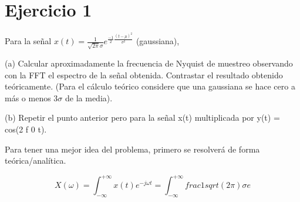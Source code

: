 \documentclass{article}
\begin{document}
\section{Ejercicio 1}

Para la señal $x(t) = \frac{1}{\sqrt{2 \pi} \sigma} e^{\frac{-1}{2} \frac{(t-\mu)^2}{\sigma^2}}$ (gaussiana),

(a) Calcular aproximadamente la frecuencia de Nyquist de muestreo observando con la FFT el
espectro de la señal obtenida. Contrastar el resultado obtenido teóricamente. (Para el cálculo
teórico considere que una gaussiana se hace cero a más o menos $3 \sigma$ de la media).

(b) Repetir el punto anterior pero para la señal x(t) multiplicada por y(t) = cos(2 f 0 t).

Para tener una mejor idea del problema, primero se resolverá de forma teórica/analítica.


\[
X(\omega) = \int_{-\infty}^{+\infty} x(t) e^{-j \omega t}
= \int_{-\infty}^{+\infty} frac 1{sqrt(2 \pi) \sigma} e
\]
\end{document}
